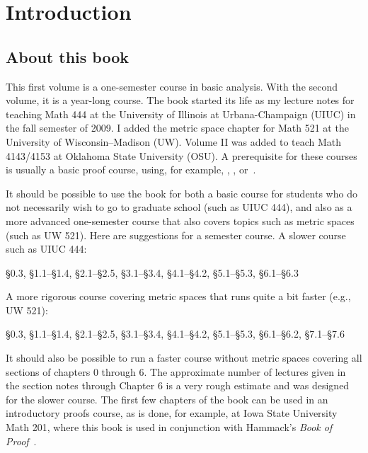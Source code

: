 \chapter*{Introduction}


\section{About this book}

\VolOneIntroExtrahead

This first volume is a one-semester course in basic analysis.
With the second volume, it is a year-long course.
The book started its life
as my lecture notes for teaching Math 444 at the
University of Illinois at Urbana-Champaign (UIUC) in the fall semester of 2009.
I added the metric space chapter for Math 521 at the University of
Wisconsin--Madison (UW)\@.
Volume II was added to teach Math 4143/4153 at Oklahoma State University
(OSU)\@.
A prerequisite for these courses is usually a basic proof course,
using, for example, \cite{Hammack}, \cite{GIAM}, or~\cite{DW}.

It should be possible to use the book for
both a basic course for students who do not necessarily wish to
go to graduate school (such as UIUC 444), and also as a more advanced one-semester
course that also covers topics such as metric spaces (such as UW 521).
Here are suggestions for a semester course.
A slower course such as UIUC 444:
\begin{center}
\S0.3, \S1.1--\S1.4, \S2.1--\S2.5, \S3.1--\S3.4, \S4.1--\S4.2,
\S5.1--\S5.3, \S6.1--\S6.3
\end{center}
A more rigorous course covering metric spaces that runs quite a bit faster
(e.g., UW 521):
\begin{center}
\S0.3, \S1.1--\S1.4, \S2.1--\S2.5, \S3.1--\S3.4, \S4.1--\S4.2,
\S5.1--\S5.3, \S6.1--\S6.2, \S7.1--\S7.6
\end{center}
It should also be possible to run a faster course without metric spaces
covering all sections of chapters 0 through 6.  The approximate number of
lectures given in the section notes through Chapter 6 is a very rough
estimate and was designed for the slower course.
The first few chapters of the book can be used in an introductory proofs
course, as is done, for example, at Iowa State University Math 201, where
this book is used in conjunction with Hammack's \emph{Book of Proof}~\cite{Hammack}.

